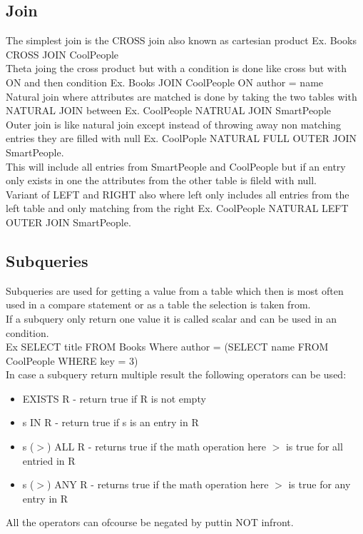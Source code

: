 \documentclass[12pt, a4paper]{article}
\begin{document}
		\subsection{Join}
			The simplest join is the CROSS join also known as cartesian product Ex. Books CROSS JOIN CoolPeople\\
			Theta joing the cross product but with a condition is done like cross but with ON and then condition Ex. Books JOIN CoolPeople ON author = name\\
			Natural join where attributes are matched is done by taking the two tables with NATURAL JOIN between Ex. CoolPeople NATRUAL JOIN SmartPeople\\
			Outer join is like natural join except instead of throwing away non matching entries they are filled with null Ex. CoolPople NATURAL FULL OUTER JOIN SmartPeople. \\
			This will include all entries from SmartPeople and CoolPeople but if an entry only exists in one the attributes from the other table is fileld with null.\\
			Variant of LEFT and RIGHT also where left only includes all entries from the left table and only matching from the right Ex. CoolPeople NATURAL LEFT OUTER JOIN SmartPeople.\\
		 \subsection{Subqueries}
		 	Subqueries are used for getting a value from a table which then is most often used in a compare statement or as a table the selection is taken from.\\
		 	If a subquery only return one value it is called scalar and can be used in an condition.\\
		 	Ex SELECT title FROM Books Where author = (SELECT name FROM CoolPeople WHERE key = 3)\\
		 	In case a subquery return multiple result the following operators can be used:
		 	\begin{itemize}
		 		\item EXISTS R - return true if R is not empty
		 		\item s IN R - return true if s is an entry in R
		 		\item s ($>$) ALL R - returns true if the math operation here $>$ is true for all entried in R
		 		\item s ($>$) ANY R - returns true if the math operation here $>$ is true for any entry in R
			\end{itemize}
			All the operators can ofcourse be negated by puttin NOT infront.
\end{document}
